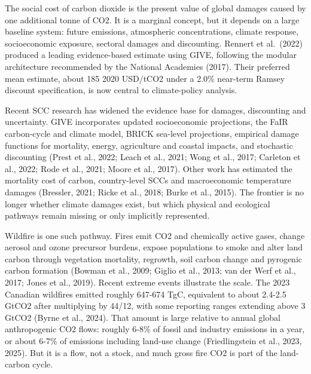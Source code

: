 \documentclass[12pt]{article}
\begin{document}
The social cost of carbon dioxide is the present value of global damages
caused by one additional tonne of CO2. It is a marginal concept, but it
depends on a large baseline system: future emissions, atmospheric
concentrations, climate response, socioeconomic exposure, sectoral
damages and discounting. Rennert et al.~(2022) produced a leading
evidence-based estimate using GIVE, following the modular architecture
recommended by the National Academies (2017). Their preferred mean
estimate, about 185 2020 USD/tCO2 under a 2.0\% near-term Ramsey
discount specification, is now central to climate-policy analysis.

Recent SCC research has widened the evidence base for damages,
discounting and uncertainty. GIVE incorporates updated socioeconomic
projections, the FaIR carbon-cycle and climate model, BRICK sea-level
projections, empirical damage functions for mortality, energy,
agriculture and coastal impacts, and stochastic discounting (Prest et
al., 2022; Leach et al., 2021; Wong et al., 2017; Carleton et al., 2022;
Rode et al., 2021; Moore et al., 2017). Other work has estimated the
mortality cost of carbon, country-level SCCs and macroeconomic
temperature damages (Bressler, 2021; Ricke et al., 2018; Burke et al.,
2015). The frontier is no longer whether climate damages exist, but
which physical and ecological pathways remain missing or only implicitly
represented.

Wildfire is one such pathway. Fires emit CO2 and chemically active
gases, change aerosol and ozone precursor burdens, expose populations to
smoke and alter land carbon through vegetation mortality, regrowth, soil
carbon change and pyrogenic carbon formation (Bowman et al., 2009;
Giglio et al., 2013; van der Werf et al., 2017; Jones et al., 2019).
Recent extreme events illustrate the scale. The 2023 Canadian wildfires
emitted roughly 647-674 TgC, equivalent to about 2.4-2.5 GtCO2 after
multiplying by 44/12, with some reporting ranges extending above 3 GtCO2
(Byrne et al., 2024). That amount is large relative to annual global
anthropogenic CO2 flows: roughly 6-8\% of fossil and industry emissions
in a year, or about 6-7\% of emissions including land-use change
(Friedlingstein et al., 2023, 2025). But it is a flow, not a stock, and
much gross fire CO2 is part of the land-carbon cycle.
\end{document}
